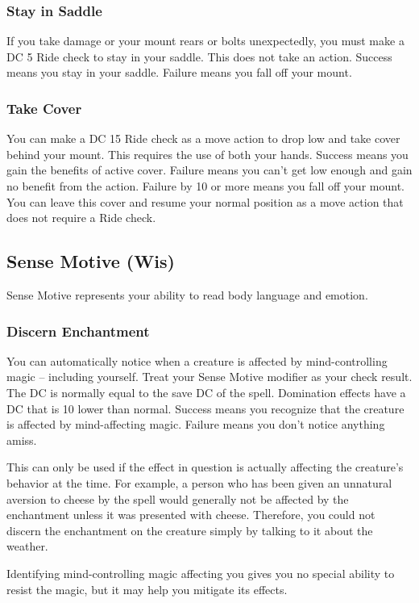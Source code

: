\subsubsection{Stay in Saddle}
If you take damage or your mount rears or bolts unexpectedly, you must make a DC 5 Ride check to stay in your saddle. This does not take an action. Success means you stay in your saddle. Failure means you fall off your mount.

\subsubsection{Take Cover}
You can make a DC 15 Ride check as a move action to drop low and take cover behind your mount. This requires the use of both your hands. Success means you gain the benefits of active cover. Failure means you can't get low enough and gain no benefit from the action. Failure by 10 or more means you fall off your mount. You can leave this cover and resume your normal position as a move action that does not require a Ride check.

\subsection{Sense Motive (Wis)}
Sense Motive represents your ability to read body language and emotion.

\subsubsection{Discern Enchantment}
You can automatically notice when a creature is affected by mind-controlling magic -- including yourself. Treat your Sense Motive modifier as your check result. The DC is normally equal to the save DC of the spell. Domination effects have a DC that is 10 lower than normal. Success means you recognize that the creature is affected by mind-affecting magic. Failure means you don't notice anything amiss.

This can only be used if the effect in question is actually affecting the creature's behavior at the time. For example, a person who has been given an unnatural aversion to cheese by the  spell would generally not be affected by the enchantment unless it was presented with cheese. Therefore, you could not discern the enchantment on the creature simply by talking to it about the weather. 

Identifying mind-controlling magic affecting you gives you no special ability to resist the magic, but it may help you mitigate its effects.

